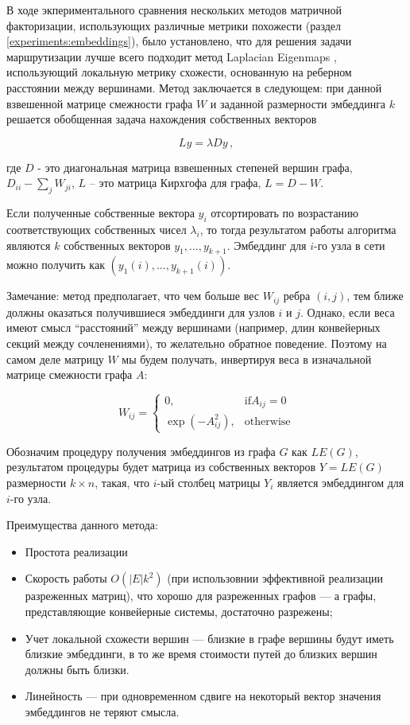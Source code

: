 \documentclass[specification,annotation,times]{itmo-student-thesis}
\theoremstyle{definition}
\begin{document}
В ходе экпериментального сравнения нескольких методов матричной факторизации,
использующих различные метрики похожести (раздел \ref{experiments:embeddings}),
было установлено, что для решения задачи маршрутизации лучше всего подходит
метод Laplacian Eigenmaps \cite{belkin2002laplacian}, использующий локальную
метрику схожести, основанную на реберном расстоянии между вершинами. Метод
заключается в следующем: при данной взвешенной матрице смежности графа $W$ и
заданной размерности эмбеддинга $k$ решается обобщенная задача нахождения
собственных векторов

\begin{equation}\label{eqs:lap}
  L y = \lambda D y \,,
\end{equation}

где $D$ - это диагональная матрица взвешенных степеней вершин графа,
$D_{ii}-\sum_j W_{ji}$, $L$ -- это матрица Кирхгофа для графа, $L = D - W$.

Если полученные собственные вектора $y_i$ отсортировать по возрастанию
соответствующих собственных чисел $\lambda_i$, то тогда результатом работы
алгоритма являются $k$ собственных векторов $y_1, ..., y_{k+1}$.
Эмбеддинг для $i$-го узла в сети можно получить как
$(y_1(i), ..., y_{k+1}(i))$.

Замечание: метод предполагает, что чем больше вес $W_{ij}$ ребра $(i, j)$, тем
ближе должны оказаться получившиеся эмбеддинги для узлов $i$ и $j$. Однако, если
веса имеют смысл ``расстояний'' между вершинами (например, длин конвейерных
секций между сочленениями), то желательно обратное поведение. Поэтому на самом
деле матрицу $W$ мы будем получать, инвертируя веса в изначальной матрице
смежности графа $A$:

\begin{equation}
  W_{ij} = \begin{cases}
    0, & \text{if} A_{ij} = 0 \\
    \exp(-A_{ij}^2), & \text{otherwise}
  \end{cases}
\end{equation}

Обозначим процедуру получения эмбеддингов из графа $G$ как $LE(G)$,
результатом процедуры будет матрица из собственных векторов $Y = LE(G)$
размерности $k \times n$, такая, что $i$-ый столбец матрицы $Y_i$ является
эмбеддингом для $i$-го узла.

Преимущества данного метода:
\begin{itemize}
\item Простота реализации
\item Скорость работы $O(|E|k^2)$ \cite{goyal2018graph} (при использовнии
  эффективной реализации разреженных матриц), что хорошо для разреженных графов
  --- а графы, представляющие конвейерные системы, достаточно разрежены;
\item Учет локальной схожести вершин --- близкие в графе вершины будут иметь
  близкие эмбеддинги, в то же время стоимости путей до близких вершин должны
  быть близки.
\item Линейность --- при одновременном сдвиге на некоторый вектор значения
  эмбеддингов не теряют смысла.
\end{itemize}
\end{document}
